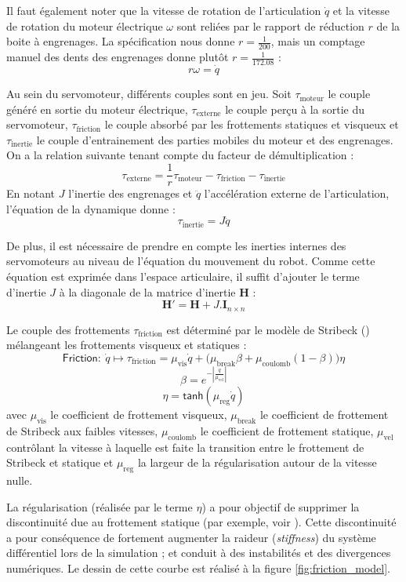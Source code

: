 Il faut également noter que la vitesse de rotation de l'articulation $\dot{q}$
et la vitesse de rotation du moteur électrique $\omega$ sont reliées par
le rapport de réduction $r$ de la boite à engrenages.
La spécification nous donne $r = \frac{1}{200}$, mais un comptage manuel 
des dents des engrenages donne plutôt $r = \frac{1}{172.08}$ :
$$
r \omega = \dot{q}
$$

Au sein du servomoteur, différents couples sont en jeu. 
Soit $\tau_{\text{moteur}}$ le couple généré en sortie du moteur
électrique, $\tau_{\text{externe}}$ le couple perçu à la sortie du
servomoteur, $\tau_{\text{friction}}$ le couple absorbé par les frottements
statiques et visqueux et $\tau_{\text{inertie}}$ le couple d'entrainement 
des parties mobiles du moteur et des engrenages.
On a la relation suivante tenant compte du facteur de démultiplication :
$$
\tau_{\text{externe}} = \frac{1}{r} \tau_{\text{moteur}} - \tau_{\text{friction}} - \tau_{\text{inertie}}
$$
En notant $J$ l'inertie des engrenages et $\ddot{q}$ l'accélération externe de l'articulation,
l'équation de la dynamique donne :
$$
\tau_{\text{inertie}} = J \ddot{q}
$$
\newline

De plus, il est nécessaire de prendre en compte les inerties internes 
des servomoteurs au niveau de l'équation du mouvement du robot.
Comme cette équation est exprimée dans l'espace articulaire, il suffit d'ajouter
le terme d'inertie $J$ à la diagonale de la matrice d'inertie $\bm{H}$ :
$$
\bm{H}' = \bm{H} + J.\bm{I}_{n \times n}
$$
\newline

Le couple des frottements $\tau_{\text{friction}}$ est déterminé
par le modèle de Stribeck (\cite{stribeck_wesentlichen_1903}) mélangeant
les frottements visqueux et statiques :
$$
\mathsf{Friction} :~ \dot{q}
\longmapsto 
\tau_{\text{friction}}
=
\mu_{\text{vis}} \dot{q} 
+ \big( 
\mu_{\text{break}} \beta 
+ \mu_{\text{coulomb}} (1-\beta) \big) 
\eta
$$
$$
\beta = e^{-|\frac{\dot{q}}{\mu_{\text{vel}}}|}
$$
$$
\eta = \mathsf{tanh}(\mu_{\text{reg}}\dot{q})
$$
avec $\mu_{\text{vis}}$ le coefficient de frottement visqueux, 
$\mu_{\text{break}}$ le coefficient de frottement de Stribeck aux
faibles vitesses, 
$\mu_{\text{coulomb}}$ le coefficient de frottement statique,
$\mu_{\text{vel}}$ contrôlant la vitesse à laquelle est faite la transition 
entre le frottement de Stribeck et statique
et $\mu_{\text{reg}}$ la \og largeur \fg de la régularisation autour de 
la vitesse nulle.

La régularisation (réalisée par le terme $\eta$)
a pour objectif de supprimer la discontinuité due au frottement statique 
(par exemple, voir \cite{do_efficient_2007}).
Cette discontinuité a pour conséquence de fortement 
augmenter la raideur (\textit{stiffness}) du système différentiel
lors de la simulation ; et conduit à des instabilités et des divergences numériques.
Le dessin de cette courbe est réalisé à la figure \ref{fig:friction_model}.

